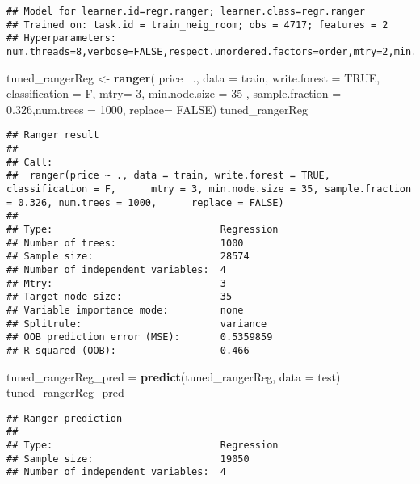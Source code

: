 \documentclass[
]{article}
\newenvironment{Shaded}{\begin{snugshade}}{\end{snugshade}}
\newcommand{\DataTypeTok}[1]{\textcolor[rgb]{0.13,0.29,0.53}{#1}}
\newcommand{\DecValTok}[1]{\textcolor[rgb]{0.00,0.00,0.81}{#1}}
\newcommand{\FloatTok}[1]{\textcolor[rgb]{0.00,0.00,0.81}{#1}}
\newcommand{\KeywordTok}[1]{\textcolor[rgb]{0.13,0.29,0.53}{\textbf{#1}}}
\newcommand{\NormalTok}[1]{#1}
\newcommand{\OperatorTok}[1]{\textcolor[rgb]{0.81,0.36,0.00}{\textbf{#1}}}
\newcommand{\OtherTok}[1]{\textcolor[rgb]{0.56,0.35,0.01}{#1}}
\newcommand{\StringTok}[1]{\textcolor[rgb]{0.31,0.60,0.02}{#1}}
\begin{document}
\begin{verbatim}
## Model for learner.id=regr.ranger; learner.class=regr.ranger
## Trained on: task.id = train_neig_room; obs = 4717; features = 2
## Hyperparameters: num.threads=8,verbose=FALSE,respect.unordered.factors=order,mtry=2,min.node.size=15,sample.fraction=0.333,num.trees=1e+03,replace=FALSE
\end{verbatim}

\begin{Shaded}
\begin{Highlighting}[]
\NormalTok{tuned_rangerReg <-}\StringTok{ }\KeywordTok{ranger}\NormalTok{( price}\OperatorTok{~}\StringTok{ }\NormalTok{., }\DataTypeTok{data =}\NormalTok{ train, }\DataTypeTok{write.forest =} \OtherTok{TRUE}\NormalTok{, }\DataTypeTok{classification =}\NormalTok{ F, }\DataTypeTok{mtry=} \DecValTok{3}\NormalTok{, }
                           \DataTypeTok{min.node.size =} \DecValTok{35}\NormalTok{   , }\DataTypeTok{sample.fraction =} \FloatTok{0.326}\NormalTok{,}\DataTypeTok{num.trees =} \DecValTok{1000}\NormalTok{, }\DataTypeTok{replace=} \OtherTok{FALSE}\NormalTok{)}
\NormalTok{tuned_rangerReg}
\end{Highlighting}
\end{Shaded}

\begin{verbatim}
## Ranger result
## 
## Call:
##  ranger(price ~ ., data = train, write.forest = TRUE, classification = F,      mtry = 3, min.node.size = 35, sample.fraction = 0.326, num.trees = 1000,      replace = FALSE) 
## 
## Type:                             Regression 
## Number of trees:                  1000 
## Sample size:                      28574 
## Number of independent variables:  4 
## Mtry:                             3 
## Target node size:                 35 
## Variable importance mode:         none 
## Splitrule:                        variance 
## OOB prediction error (MSE):       0.5359859 
## R squared (OOB):                  0.466
\end{verbatim}

\begin{Shaded}
\begin{Highlighting}[]
\NormalTok{tuned_rangerReg_pred =}\StringTok{ }\KeywordTok{predict}\NormalTok{(tuned_rangerReg, }\DataTypeTok{data =}\NormalTok{ test)}
\NormalTok{tuned_rangerReg_pred}
\end{Highlighting}
\end{Shaded}

\begin{verbatim}
## Ranger prediction
## 
## Type:                             Regression 
## Sample size:                      19050 
## Number of independent variables:  4
\end{verbatim}
\end{document}
